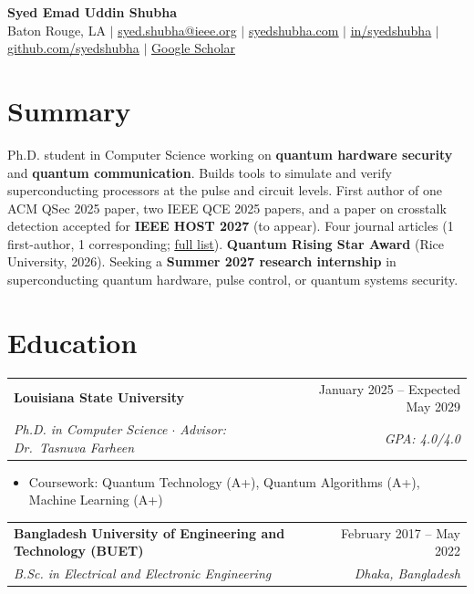 \documentclass[letterpaper,10pt]{article}
\makeatletter
\newcommand{\cvlink}[2]{\href{#1}{\underline{#2}}}
\newcommand{\entry}[4]{%
  \begin{tabularx}{\textwidth}{@{}X r@{}}
    \textbf{#1} & #2 \\
    \textit{#3} & \textit{#4}
  \end{tabularx}\par}
\makeatother
\begin{document}
\begin{center}
  {\LARGE\bfseries Syed Emad Uddin Shubha}\\[3pt]
  \small
  Baton Rouge, LA \;$|$\;
  \cvlink{mailto:syed.shubha@ieee.org}{syed.shubha@ieee.org} \;$|$\;
  \cvlink{https://syedshubha.com/}{syedshubha.com} \;$|$\;
  \cvlink{https://www.linkedin.com/in/syedshubha/}{in/syedshubha} \;$|$\;
  \cvlink{https://github.com/syedshubha}{github.com/syedshubha} \;$|$\;
  \cvlink{https://scholar.google.com/citations?user=8EK8VJMAAAAJ}{Google Scholar}   \\[1pt] %
\end{center}
\vspace{-4pt}

\section{Summary}
Ph.D. student in Computer Science working on \textbf{quantum hardware security} and \textbf{quantum communication}. Builds tools to simulate and verify superconducting processors at the pulse and circuit levels. First author of one ACM QSec 2025 paper, two IEEE QCE 2025 papers, and a paper on crosstalk detection accepted for \textbf{IEEE HOST 2027} (to appear). Four journal articles (1 first-author, 1 corresponding; \cvlink{https://syedshubha.com/publications/}{full list}). \textbf{Quantum Rising Star Award} (Rice University, 2026). Seeking a \textbf{Summer 2027 research internship} in superconducting quantum hardware, pulse control, or quantum systems security.

\section{Education}
\entry{Louisiana State University}{January 2025 -- Expected May 2029}
      {Ph.D. in Computer Science \;$\cdot$\; Advisor: Dr.~Tasnuva Farheen}{GPA: 4.0/4.0}
\vspace{-2pt}
\begin{itemize}
  \item Coursework: Quantum Technology (A+), Quantum Algorithms (A+), Machine Learning (A+)
\end{itemize}
\entry{Bangladesh University of Engineering and Technology (BUET)}{February 2017 -- May 2022}
      {B.Sc. in Electrical and Electronic Engineering}{Dhaka, Bangladesh}
\end{document}
